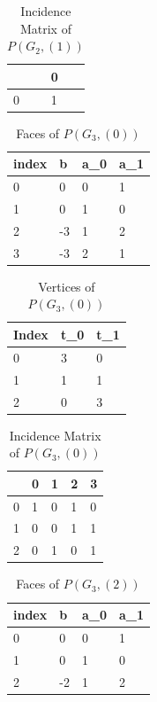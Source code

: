 \documentclass{article}
\begin{document}
\begin{table}[H]
	\centering
	\caption{Incidence Matrix of $P(G_2, (1))$}
	\label{G2Inc1}
	\begin{tabular}{@{}ll@{}}
		\toprule
		& 0 \\ \midrule
		0 & 1 \\ \bottomrule
	\end{tabular}
\end{table}

\begin{table}[H]
	\centering
	\caption{Faces of $P(G_3, (0))$}
	\label{G3Faces}
	\begin{tabular}{@{}llll@{}}
		\toprule
index & b  & a\_0 & a\_1 \\ \midrule
0     & 0  & 0    & 1    \\
1     & 0  & 1    & 0    \\
2     & -3 & 1    & 2    \\
3     & -3 & 2    & 1    \\ \bottomrule
	\end{tabular}
\end{table}

\begin{table}[H]
	\centering
	\caption{Vertices of $P(G_3, (0))$}
	\label{G3Verts}
	\begin{tabular}{@{}lll@{}}
		\toprule
		Index & t\_0 & t\_1 \\ \midrule
		0     & 3    & 0    \\
		1     & 1    & 1    \\
		2     & 0    & 3    \\ \bottomrule
	\end{tabular}
\end{table}

\begin{table}[H]
	\centering
	\caption{Incidence Matrix of $P(G_3, (0))$}
	\label{G3Inc}
	\begin{tabular}{@{}lllll@{}}
		\toprule
		& 0 & 1 & 2 & 3 \\ \midrule
		0 & 1 & 0 & 1 & 0 \\
		1 & 0 & 0 & 1 & 1 \\
		2 & 0 & 1 & 0 & 1 \\ \bottomrule
	\end{tabular}
\end{table}

\begin{table}[H]
	\centering
	\caption{Faces of $P(G_3, (2))$}
	\label{G3Faces2}
	\begin{tabular}{@{}llll@{}}
		\toprule
		index & b  & a\_0 & a\_1 \\ \midrule
		0     & 0  & 0    & 1    \\
		1     & 0  & 1    & 0    \\
		2     & -2 & 1    & 2    \\ \bottomrule
	\end{tabular}
\end{table}
\end{document}

